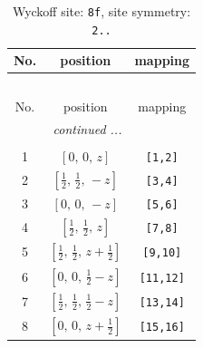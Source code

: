 \documentclass[fleqn,8pt]{jsarticle}
\begin{document}
\begin{longtable}{ccc}
\caption{Wyckoff site: {\tt 8f}, site symmetry: {\tt 2..}}
 \\
 \hline \hline
No. & position & mapping \\ \hline \endfirsthead

\multicolumn{2}{l}{\tablename\ \thetable{}} \\
 \hline \hline
No. & position & mapping \\ \hline \endhead

 \hline \hline
\multicolumn{2}{r}{\footnotesize\it continued ...} \\ \endfoot

 \hline \hline
\multicolumn{2}{r}{} \\ \endlastfoot

1 & $\left[ 0,\, 0,\, z \right]$ & {\tt [1,2]} \\ \hline
2 & $\left[ \frac{1}{2},\, \frac{1}{2},\, - z \right]$ & {\tt [3,4]} \\ \hline
3 & $\left[ 0,\, 0,\, - z \right]$ & {\tt [5,6]} \\ \hline
4 & $\left[ \frac{1}{2},\, \frac{1}{2},\, z \right]$ & {\tt [7,8]} \\ \hline
5 & $\left[ \frac{1}{2},\, \frac{1}{2},\, z + \frac{1}{2} \right]$ & {\tt [9,10]} \\ \hline
6 & $\left[ 0,\, 0,\, \frac{1}{2} - z \right]$ & {\tt [11,12]} \\ \hline
7 & $\left[ \frac{1}{2},\, \frac{1}{2},\, \frac{1}{2} - z \right]$ & {\tt [13,14]} \\ \hline
8 & $\left[ 0,\, 0,\, z + \frac{1}{2} \right]$ & {\tt [15,16]} \\
\end{longtable}
\renewcommand{\arraystretch}{1.2}
\end{document}
